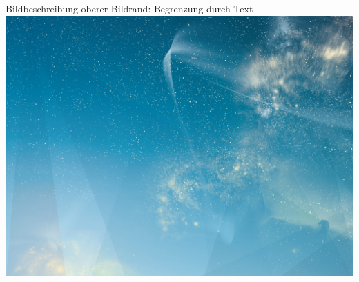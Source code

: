 \begin{frame}

Bildbeschreibung\newline
oberer Bildrand: Begrenzung durch Text\\[\baselineskip]

\includegraphics[width=\textwidth, height=.55\textheight]{./Resources/Images/SternenhimmelQuer.jpg}%

\end{frame}
\clearpage


